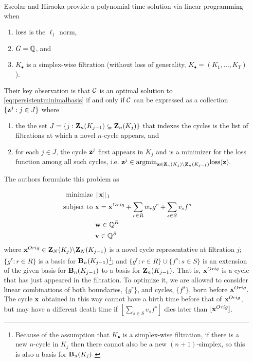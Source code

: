 Escolar and Hiraoka \cite{Escolar2016} provide a polynomial time solution via linear programming when
    \begin{enumerate}
        \item $\mathrm{loss}$ is the $\ell_1$ norm,
        \item $G = \mathbb{Q}$, and
        \item $K_\bullet$ is a simplex-wise filtration (without loss of generality, $K_\bullet = (K_1, \ldots, K_T)$).
    \end{enumerate}
    
 
Their key observation is that $\mathcal{C}$ is an optimal solution to \pr \eqref{eq:persistentminimalbasis} if and only if $\mathcal{C}$ can be expressed as a collection $\{{\mathbf z}^j : j \in J\}$ where  \begin{enumerate}
    \item the the set $J = \{j :  \mathbf{Z}_n(K_{j-1}) \subsetneq \mathbf{Z}_n(K_j) \}$ that indexes the cycles is the list of filtrations at which a novel $n$-cycle appears, and
    \item for each $j \in J$, the cycle ${\mathbf z}^j$ first appears in $K_j$ and is a minimizer for the loss function among all such cycles, i.e. ${\mathbf z}^j \in \mathrm{argmin}_{{\mathbf z} \in \mathbf{Z}_n(K_j) \backslash \mathbf{Z}_n(K_{j-1})} \mathrm{loss}({\mathbf z}).$
\end{enumerate}
The authors formulate this problem as 

 
\begin{align}
\begin{split}
\text{minimize } & ||\mathbf{x} ||_1  \\
\text{ subject to } & \mathbf{x} = \mathbf{x}^{Orig} + \sum_{r\in R} w_r g^r + \sum_{s \in S} v_s f^s \\
& \mathbf{w} \in \mathbb{Q}^R  \\
& \mathbf{v} \in \mathbb{Q}^S
\end{split}
\label{eq:escolarargmin}
\end{align}
where $\mathbf{x}^{Orig} \in\mathbf{Z}_N(K_j) \backslash \mathbf{Z}_N(K_{j-1})$ is a novel cycle representative at filtration $j$; $\{g^r : r \in R\}$ is a basis for $\mathbf{B}_n(K_{j-1})$\footnote{Because of the assumption that $K_\bullet$ is a simplex-wise filtration, if there is a new $n$-cycle in $K_j$ then there cannot also be a new $(n+1)$-simplex, so this is also a basis for $\mathbf{B}_n(K_j).$}; and $\{g^r : r \in R\} \cup \{f^s : s \in S\}$ is an extension of the given basis for $\mathbf{B}_n(K_{j-1})$ to a basis for $\mathbf{Z}_n(K_{j-1})$. That is, $\mathbf{x}^{Orig}$ is a cycle that has just appeared in the filtration. To optimize it, we are allowed to consider linear combinations of both boundaries, $\{g^r\}$, and cycles, $\{f^s\}$, born before $\mathbf{x}^{Orig}.$ The cycle $\mathbf{x}$ obtained in this way cannot have a birth time before that of $\mathbf{x}^{Orig}$, but may have a different death time if $[\sum_{s\in S}v_sf^s]$ dies later than $[\mathbf{x}^{Orig}]$. 

